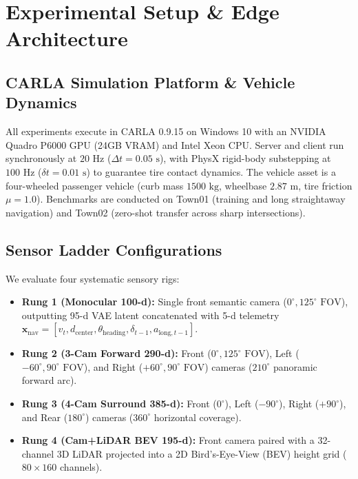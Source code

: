 \documentclass[conference]{IEEEtran}
\begin{document}
\section{Experimental Setup \& Edge Architecture}

\subsection{CARLA Simulation Platform \& Vehicle Dynamics}
All experiments execute in CARLA 0.9.15 on Windows 10 with an NVIDIA Quadro P6000 GPU (24GB VRAM) and Intel Xeon CPU. Server and client run synchronously at $20\text{ Hz}$ ($\Delta t = 0.05\text{ s}$), with PhysX rigid-body substepping at $100\text{ Hz}$ ($\delta t = 0.01\text{ s}$) to guarantee tire contact dynamics. The vehicle asset is a four-wheeled passenger vehicle (curb mass $1500\text{ kg}$, wheelbase $2.87\text{ m}$, tire friction $\mu = 1.0$). Benchmarks are conducted on Town01 (training and long straightaway navigation) and Town02 (zero-shot transfer across sharp intersections).

\subsection{Sensor Ladder Configurations}
We evaluate four systematic sensory rigs:
\begin{itemize}
    \item \textbf{Rung 1 (Monocular 100-d):} Single front semantic camera ($0^\circ, 125^\circ\text{ FOV}$), outputting 95-d VAE latent concatenated with 5-d telemetry $\mathbf{x}_{\text{nav}} = [v_t, d_{\text{center}}, \theta_{\text{heading}}, \delta_{t-1}, a_{\text{long}, t-1}]$.
    \item \textbf{Rung 2 (3-Cam Forward 290-d):} Front ($0^\circ, 125^\circ\text{ FOV}$), Left ($-60^\circ, 90^\circ\text{ FOV}$), and Right ($+60^\circ, 90^\circ\text{ FOV}$) cameras ($210^\circ$ panoramic forward arc).
    \item \textbf{Rung 3 (4-Cam Surround 385-d):} Front ($0^\circ$), Left ($-90^\circ$), Right ($+90^\circ$), and Rear ($180^\circ$) cameras ($360^\circ$ horizontal coverage).
    \item \textbf{Rung 4 (Cam+LiDAR BEV 195-d):} Front camera paired with a 32-channel 3D LiDAR projected into a 2D Bird's-Eye-View (BEV) height grid ($80 \times 160$ channels).
\end{itemize}
\end{document}
